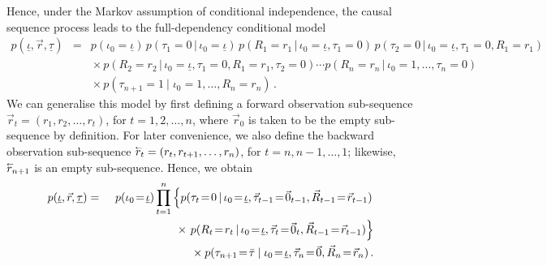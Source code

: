 \documentclass[a4paper]{article}
\newcommand{\rvec}[1]{\accentset{\leftarrow}{#1}}
\begin{document}
Hence, under the Markov assumption of conditional independence,
the causal sequence process leads to the full-dependency conditional model
\begin{eqnarray}
p(\underline{\iota},\vec{r},\underline{\tau}) & = &
p(\iota_0\!=\!\underline{\iota})
\,p(\tau_1\!=\!0\,|\,\iota_0\!=\!\underline{\iota})
\,p(R_1\!=\!r_1\,|\,\iota_0\!=\!\underline{\iota},\tau_1\!=\!0)
\,p(\tau_2\!=\!0\,|\,\iota_0\!=\!\underline{\iota},\tau_1\!=\!0,R_1\!=\!r_1)
\nonumber\\&&
{}\times p(R_2\!=\!r_2\,|\,\iota_0\!=\!\underline{\iota},\tau_1\!=\!0,R_1\!=\!r_1,\tau_2\!=\!0)
\cdots
p(R_n\!=\!r_n\,|\,\iota_0\!=\!1,\ldots,\tau_{n}\!=\!0)
\nonumber\\&&
{}\times p(\tau_{n+1}\!=\!1\:|\;\iota_0\!=\!1,\ldots,R_n\!=\!r_n)
\,.
\label{eq:temporal-model-full}
\end{eqnarray}
We can generalise this model by first defining a forward observation sub-sequence $\vec{r}_t=(r_1,r_2,\ldots,r_t)$,
for $t=1,2,\ldots,n$, where $\vec{r}_0$ is taken to be the empty sub-sequence by definition.
 For later convenience, we also define the backward observation sub-sequence $\rvec{r}_t=(r_t,r_{t+1},\ldots,r_n)$,
for $t=n,n-1,\ldots,1$; likewise, $\rvec{r}_{n+1}$ is an empty sub-sequence.
Hence, we obtain
\begin{eqnarray}
p(\underline{\iota},\vec{r},\underline{\tau}) & = &
p(\iota_0\!=\!\underline{\iota})
\prod_{t=1}^{n}\left\{p(\tau_t\!=\!0\,|\,\iota_0\!=\!\underline{\iota},\vec{\tau}_{t-1}\!=\!\vec{0}_{t-1},
\vec{R}_{t-1}\!=\!\vec{r}_{t-1})\right.
\nonumber\\&&
\hspace*{20mm}{}\times \left.
p(R_t\!=\!r_t\,|\,\iota_0\!=\!\underline{\iota},\vec{\tau}_t\!=\!\vec{0}_t,\vec{R}_{t-1}\!=\!\vec{r}_{t-1})\right\}
\nonumber\\&&
{}\times p(\tau_{n+1}\!=\!\bar{\tau}\:|\;\iota_0\!=\!\underline{\iota},\vec{\tau}_n\!=\!\vec{0},\vec{R}_n\!=\!\vec{r}_n)
\,.
\label{eq:temporal-model}
\end{eqnarray}
\end{document}
